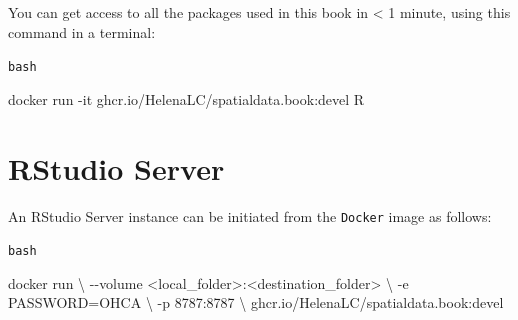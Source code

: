\documentclass[
  letterpaper,
  DIV=11,
  numbers=noendperiod]{scrreprt}
\newenvironment{Shaded}{\begin{snugshade}}{\end{snugshade}}
\newcommand{\AttributeTok}[1]{\textcolor[rgb]{0.40,0.45,0.13}{#1}}
\newcommand{\DataTypeTok}[1]{\textcolor[rgb]{0.68,0.00,0.00}{#1}}
\newcommand{\ExtensionTok}[1]{\textcolor[rgb]{0.00,0.23,0.31}{#1}}
\newcommand{\NormalTok}[1]{\textcolor[rgb]{0.00,0.23,0.31}{#1}}
\newcommand{\OperatorTok}[1]{\textcolor[rgb]{0.37,0.37,0.37}{#1}}
\begin{document}
\begin{tcolorbox}[enhanced jigsaw, toprule=.15mm, title=\textcolor{quarto-callout-tip-color}{\faLightbulb}\hspace{0.5em}{Get started now 🎉}, breakable, coltitle=black, colback=white, colframe=quarto-callout-tip-color-frame, left=2mm, opacityback=0, colbacktitle=quarto-callout-tip-color!10!white, opacitybacktitle=0.6, rightrule=.15mm, toptitle=1mm, arc=.35mm, bottomtitle=1mm, titlerule=0mm, bottomrule=.15mm, leftrule=.75mm]

You can get access to all the packages used in this book in \textless{}
1 minute, using this command in a terminal:

\begin{codelisting}[H]

\caption{\texttt{bash}}

\begin{Shaded}
\begin{Highlighting}[]
\ExtensionTok{docker}\NormalTok{ run }\AttributeTok{{-}it}\NormalTok{ ghcr.io/HelenaLC/spatialdata.book:devel R}
\end{Highlighting}
\end{Shaded}

\end{codelisting}

\end{tcolorbox}


\chapter*{RStudio Server}\label{rstudio-server}


An RStudio Server instance can be initiated from the \texttt{Docker}
image as follows:

\begin{codelisting}

\caption{\texttt{bash}}

\begin{Shaded}
\begin{Highlighting}[]
\ExtensionTok{docker}\NormalTok{ run }\DataTypeTok{\textbackslash{}}
    \AttributeTok{{-}{-}volume} \OperatorTok{\textless{}}\NormalTok{local\_folder}\OperatorTok{\textgreater{}}\NormalTok{:}\OperatorTok{\textless{}}\NormalTok{destination\_folder}\OperatorTok{\textgreater{}} \DataTypeTok{\textbackslash{}}
    \AttributeTok{{-}e}\NormalTok{ PASSWORD=OHCA }\DataTypeTok{\textbackslash{}}
    \AttributeTok{{-}p}\NormalTok{ 8787:8787 }\DataTypeTok{\textbackslash{}}
\NormalTok{    ghcr.io/HelenaLC/spatialdata.book:devel}
\end{Highlighting}
\end{Shaded}

\end{codelisting}
\end{document}
